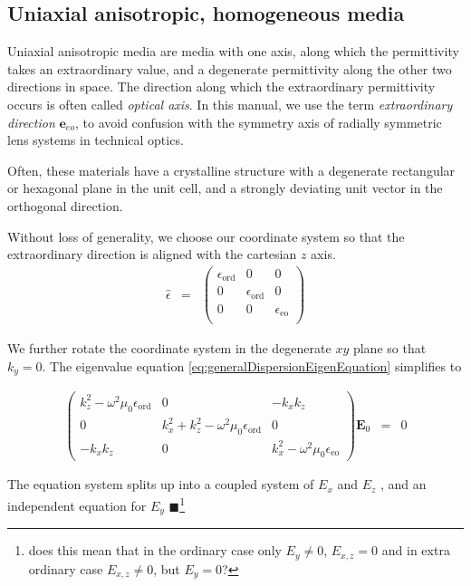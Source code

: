 \documentclass[12pt,a4paper,twoside,openright,BCOR10mm,headsepline,titlepage,abstracton,chapterprefix,final]{scrreprt}
\newcommand\Vector[1]{{\mathbf{#1}}}
\newcommand\vacuum{0}
\newcommand\wavenumber{k}
\newcommand\Tensor[1]{\hat{#1}}
\newcommand\scalarEfield{E}
\newcommand\Efield{\Vector{\scalarEfield}}
\newcommand\vacuumpermeability{\mu_{\vacuum}}
\newcommand\permittivity{\Tensor{\epsilon}}
\newcommand\scalarpermittivity{\epsilon}
\newcommand\ordi{\text{ord}}
\newcommand\eo{\text{eo}}
\newcommand{\remark}[1]{{\color{red}$\blacksquare$}\footnote{{\color{red}#1}}}
\newcommand{\chk}[1]{\color{green}{$\checkmark$#1}}
\begin{document}
\subsection{Uniaxial anisotropic, homogeneous media\chk{JH}}
Uniaxial anisotropic media are media with one axis, along which the permittivity takes an extraordinary value, 
and a degenerate permittivity along the other two directions in space.
The direction along which the extraordinary permittivity occurs is often called \emph{optical axis}. 
In this manual, we use the term \emph{extraordinary direction} $\Vector{e}_{eo}$, to avoid confusion with the symmetry axis of radially symmetric lens systems in technical optics.

Often, these materials have a crystalline structure with a degenerate rectangular or hexagonal plane in the unit cell, 
and a strongly deviating unit vector in the orthogonal direction. 

Without loss of generality, we choose our coordinate system so that the extraordinary direction is aligned with the cartesian $z$ axis.
\begin{eqnarray}
 \permittivity &=&
 \begin{pmatrix}
  \scalarpermittivity_{\ordi}  & 0 & 0 \\
  0 & \scalarpermittivity_{\ordi}  & 0 \\
  0 & 0 & \scalarpermittivity_{\eo}   \\
 \end{pmatrix}
\end{eqnarray}

We further rotate the coordinate system in the degenerate $xy$ plane so that $\wavenumber_y = 0$.
The eigenvalue equation \ref{eq:generalDispersionEigenEquation} simplifies to

\begin{eqnarray}
\begin{pmatrix}
 \wavenumber_z^2 - \omega^2 \vacuumpermeability \scalarpermittivity_{\ordi} 
 &
 0
 &
 - \wavenumber_x \wavenumber_z 
 \\
 0
 &
 \wavenumber_x^2 + \wavenumber_z^2 - \omega^2 \vacuumpermeability \scalarpermittivity_{\ordi} 
 &
 0 
 \\
 - \wavenumber_x \wavenumber_z 
 &
 0 
 &
 \wavenumber_x^2 - \omega^2 \vacuumpermeability \scalarpermittivity_{\eo}  
\end{pmatrix}
\Efield_0
&=& 0
\end{eqnarray}

The equation system splits up into a coupled system of $\scalarEfield_x$ and $\scalarEfield_z$ , and an independent equation for $\scalarEfield_y$
\remark{does this mean that in the ordinary case only $\scalarEfield_y \ne 0$, $\scalarEfield_{x,z} = 0$ and in extra ordinary case $\scalarEfield_{x,z} \ne 0$, but $\scalarEfield_y = 0$?}
\end{document}

